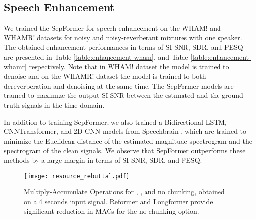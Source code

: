 \documentclass[lettersize,journal]{IEEEtran}
\begin{document}
\subsection{Speech Enhancement}
We trained the SepFormer for speech enhancement on the WHAM! and WHAMR! datasets for noisy and noisy-reverberant mixtures with one speaker. The obtained enhancement performances in terms of SI-SNR, SDR, and PESQ \cite{Pesq} are presented in Table \ref{table:enhancement-wham}, and Table \ref{table:enhancement-whamr} respectively. 
Note that in WHAM! dataset the model is trained to denoise and on the WHAMR! dataset the model is trained to both dereverberation and denoising at the same time. The SepFormer models are trained to maximize the output SI-SNR between the estimated and the ground truth signals in the time domain. 

In addition to training  SepFormer, we also trained a Bidirectional LSTM, CNNTransformer, and 2D-CNN models from Speechbrain \cite{speechbrain}, which are trained to minimize the Euclidean distance of the estimated magnitude spectrogram and the spectrogram of the clean signals. We observe that SepFormer outperforms these methods by a large margin in terms of SI-SNR, SDR, and PESQ.   


\begin{figure}[t]
    \centering
    \texttt{[image: resource\_rebuttal.pdf]}
    \caption{Multiply-Accumulate Operations for , , and no chunking, obtained on a 4 seconds input signal. Reformer and Longformer provide significant reduction in MACs for the no-chunking option.}
    \label{fig:macs}
\end{figure}
\end{document}

